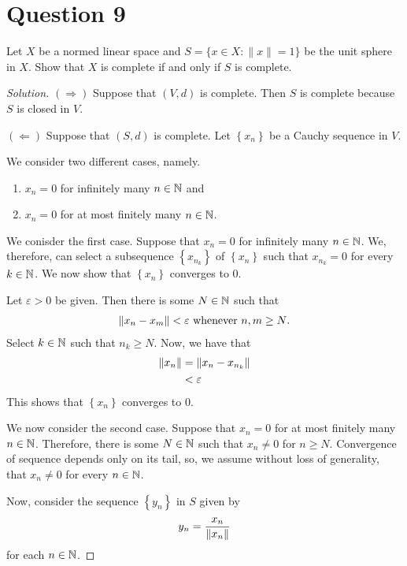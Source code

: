 \section{Question 9}
\horz
Let $X$ be a normed linear space and $S=\{x\in X: \|x\|=1\}$ be the unit sphere in $X$. Show that $X$ is complete if and only if $S$ is complete. 
\horz
\begin{proof}[Solution]
    $\left( \Rightarrow \right)$ Suppose that $\left( V,d \right)$ is complete. Then $S$ is complete because $S$ is closed in $V$. 

    $\left( \Leftarrow \right)$ Suppose that $\left( S,d \right)$ is complete. Let $\left\{ x_{n} \right\}$ be a Cauchy sequence in $V$.

    We consider two different cases, namely.
    \begin{enumerate}[label=(\roman*)]
	\item $x_{n} = 0$ for infinitely many $n\in \mathbb N$ and
	\item $x_{n} = 0$ for at most finitely many $n\in \mathbb N$.
    \end{enumerate}

    We conisder the first case. Suppose that $x_{n} = 0$ for infinitely many $n\in \mathbb N$. We, therefore, can select a subsequence $\left\{ x_{n_k} \right\}$ of $\left\{ x_{n} \right\}$ such that $x_{n_{k}} = 0$ for every $k\in \mathbb N$. We now show that $\left\{ x_{n} \right\}$ converges to $0$.

    Let $\varepsilon > 0$ be given. Then there is some $N \in \mathbb N$ such that
    \begin{align*}
	\left\lVert x_{n} - x_{m} \right\rVert < \varepsilon \text{ whenever } n,m \ge N\text{.}
    \end{align*}
    Select $k\in \mathbb N$ such that $n_{k} \ge N$. Now, we have that
    \begin{align*}
	\left\lVert x_{n} \right\rVert &= \left\lVert x_{n} - x_{n_k} \right\rVert \\
	&< \varepsilon
    \end{align*}
    This shows that $\left\{ x_{n} \right\}$ converges to $0$.

    We now consider the second case. Suppose that $x_{n} = 0$ for at most finitely many $n\in \mathbb N$. Therefore, there is some $N\in \mathbb N$ such that $x_{n} \ne 0$ for $n\ge N$. Convergence of sequence depends only on its tail, so, we assume without loss of generality, that $x_{n} \ne 0$ for every $n\in \mathbb N$.
    
    Now, consider the sequence $\left\{ y_{n} \right\} $ in $S$ given by
    \begin{equation*}
	y_{n} = \frac{x_{n}}{\left\lVert x_{n} \right\rVert}
    \end{equation*}
    for each $n\in \mathbb N$.


\end{proof}
